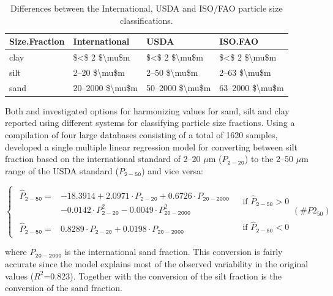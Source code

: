 \documentclass[11pt]{krantz}
\theoremstyle{definition}
\theoremstyle{definition}
\theoremstyle{definition}
\theoremstyle{remark}
\begin{document}
\begin{table}

\caption{\label{tab:usdafaotexture}Differences between the International, USDA and ISO/FAO particle size classifications.}
\centering
\begin{tabular}[t]{llll}
\toprule
Size.Fraction & International & USDA & ISO.FAO\\
\midrule
clay & \$<\$ 2 \$\textbackslash{}mu\$m & \$<\$ 2 \$\textbackslash{}mu\$m & \$<\$ 2 \$\textbackslash{}mu\$m\\
silt & 2–20 \$\textbackslash{}mu\$m & 2–50 \$\textbackslash{}mu\$m & 2–63 \$\textbackslash{}mu\$m\\
sand & 20–2000 \$\textbackslash{}mu\$m & 50–2000 \$\textbackslash{}mu\$m & 63–2000 \$\textbackslash{}mu\$m\\
\bottomrule
\end{tabular}
\end{table}

Both \citet{Nemes1999G} and \citet{Minasny2001AJSR} investigated options
for harmonizing values for sand, silt and clay reported using different
systems for classifying particle size fractions. Using a compilation of
four large databases consisting of a total of 1620 samples,
\citet{Minasny2001AJSR} developed a single multiple linear regression
model for converting between silt fraction based on the international
standard of 2--20 \(\mu\)m (\(P_{\mathtt{2-20}}\)) to the 2--50 \(\mu\)m
range of the USDA standard (\(P_{\mathtt{2-50}}\)) and vice versa:

\begin{equation}
\begin{cases}
\begin{matrix} \hat P_{\mathtt{2-50}} = & -18.3914 + 2.0971 \cdot P_{\mathtt{2-20}} + 0.6726 \cdot P_{\mathtt{20-2000}}   \\
   & - 0.0142 \cdot P_{\mathtt{2-20}}^2  - 0.0049 \cdot P_{\mathtt{20-2000}}^2
\end{matrix}   & \text{ if } \hat P_{\mathtt{2-50}} > 0 \\ \begin{matrix} \hat P_{\mathtt{2-50}} = & 0.8289 \cdot P_{\mathtt{2-20}} + 0.0198 \cdot P_{\mathtt{20-2000}} \end{matrix} & \text{ if } \hat P_{\mathtt{2-50}} < 0
\end{cases}
(\#P2_50)
\end{equation}

where \(P_{\mathtt{20-2000}}\) is the international sand fraction. This
conversion is fairly accurate since the model explains most of the
observed variability in the original values (\(R^2\)=0.823). Together
with the conversion of the silt fraction is the conversion of the sand
fraction.
\end{document}
